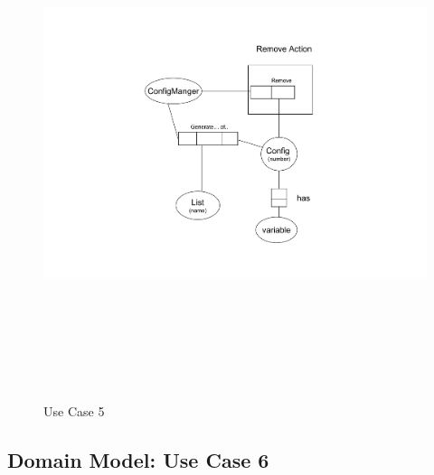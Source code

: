 \begin{figure}[htbp]
  \centering
  \includegraphics[angle=0,width=15cm,height=15cm]{"domainmodel-usecase5"}
  \caption{Use Case 5}
  \label{fig:usecase5}
\end{figure}

\newpage
\subsection{Domain Model: Use Case 6}

